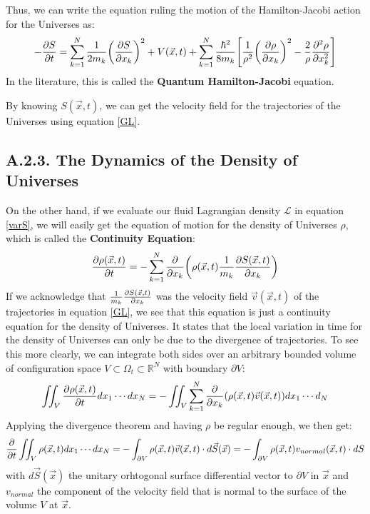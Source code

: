 \documentclass[11pt, a4paper]{article} %
\newcommand{\R}{\mathbb{R}} %
\newcommand{\Lg}{\mathscr{L}}
\begin{document}
Thus, we can write the equation ruling the motion of the Hamilton-Jacobi action for the Universes as:
\begin{equation}\label{QHJE}
-\pdv{S}{t} = \sum_{k=1}^N \frac{1}{2m_k} \qty(\pdv{S}{x_k})^2+V(\vec{x},t)+\sum_{k=1}^N \frac{\hbar^2}{8 m_k}\qty[\frac{1}{\rho^2}\qty(\pdv{\rho}{x_k})^2 -\frac{2}{\rho}\pdv[2]{\rho}{x_k}]
\end{equation}
In the literature, this is called the {\bf Quantum Hamilton-Jacobi} equation.

By knowing $S(\vec{x},t)$, we can get the velocity field for the trajectories of the Universes using equation \eqref{GL}.

\subsection*{A.2.3. The Dynamics of the Density of Universes}

On the other hand, if we evaluate our fluid Lagrangian density $\Lg$ in equation \eqref{varS}, we will easily get the equation of motion for the density of Universes $\rho$, which is called the {\bf Continuity Equation}:
\begin{equation}\label{CE}
\pdv{\rho(\vec{x},t)}{t}=-\sum_{k=1}^N\pdv{}{x_k}\qty(\rho(\vec{x},t)\frac{1}{m_k}\pdv{S(\vec{x},t)}{x_k})
\end{equation}
If we acknowledge that $\frac{1}{m_k}\pdv{S(\vec{x},t)}{x_k}$ was the velocity field $\vec{v}(\vec{x},t)$ of the trajectories in equation \eqref{GL}, we see that this equation is just a continuity equation for the density of Universes. It states that the local variation in time for the density of Universes can only be due to the divergence of trajectories. To see this more clearly, we can integrate both sides over an arbitrary bounded volume of configuration space $V\subset\Omega_t\subset\R^N$ with boundary $\partial V$:
\begin{equation}
\iint_{V}\pdv{\rho(\vec{x},t)}{t}dx_1\cdots dx_N=-\iint_{V}\sum_{k=1}^N\pdv{}{x_k}\qty(\rho(\vec{x},t)\vec{v}(\vec{x},t))dx_1\cdots d_N
\end{equation}
Applying the divergence theorem and having $\rho$ be regular enough, we then get:
\begin{equation}
\pdv{}{t} \iint_{V} \rho(\vec{x},t) dx_1\cdots dx_N=-\int_{\partial V} \rho(\vec{x},t)\vec{v}(\vec{x},t)\cdot d\vec{S}(\vec{x})=-\int_{\partial V} \rho(\vec{x},t)v_{normal}(\vec{x},t)\cdot dS
\end{equation}
with $d\vec{S}(\vec{x})$ the unitary orhtogonal surface differential vector to $\partial V$ in $\vec{x}$ and $v_{normal}$ the component of the velocity field that is normal to the surface of the volume $V$ at $\vec{x}$.
\end{document}
